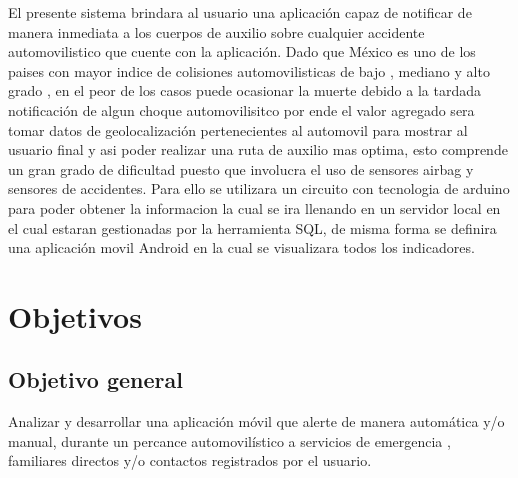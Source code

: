 El presente sistema brindara al usuario una aplicación capaz de notificar de manera inmediata a los cuerpos de auxilio sobre cualquier accidente automovilistico que cuente con la aplicación. Dado que México es uno de los paises con mayor indice de colisiones automovilisticas de bajo , mediano y alto grado , en el peor de los casos puede ocasionar la muerte  debido a la tardada notificación de algun choque automovilisitco por ende el valor agregado sera tomar datos de geolocalización pertenecientes al automovil para mostrar al usuario final  y asi poder realizar una ruta de auxilio mas optima, esto comprende un gran grado de dificultad puesto que involucra el uso de sensores airbag y sensores de accidentes. Para ello se utilizara un circuito con tecnologia de arduino para poder obtener la informacion la cual se ira llenando en un servidor local en el cual estaran gestionadas por la herramienta SQL, de misma forma se definira una aplicación movil Android en la cual se visualizara todos los indicadores.


\section{Objetivos}
\subsection{Objetivo general}
Analizar y desarrollar una aplicación móvil que alerte de manera automática y/o manual, durante un percance automovilístico a servicios de emergencia , familiares directos y/o contactos registrados por el usuario.
